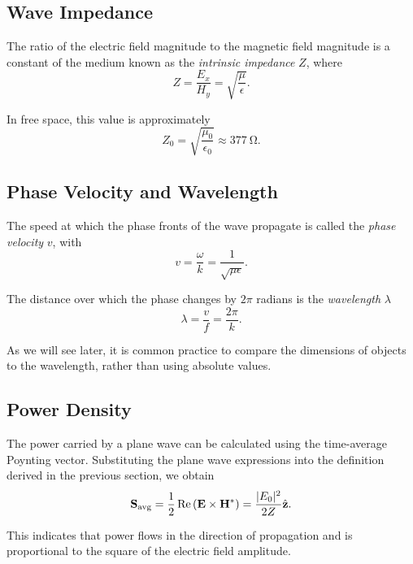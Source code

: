 \subsection{Wave Impedance}

The ratio of the electric field magnitude to the magnetic field magnitude is a constant of the medium known as the \emph{intrinsic impedance} $Z$, where
\begin{equation}
  Z = \frac{E_x}{H_y} = \sqrt{\frac{\mu}{\epsilon}}.
\end{equation}

In \gls{free space}, this value is approximately
\begin{equation}
  Z_0 = \sqrt{\frac{\mu_0}{\epsilon_0}} \approx \qty{377}{\ohm}.
\end{equation}

\subsection{Phase Velocity and Wavelength}

The speed at which the phase fronts of the wave propagate is called the \emph{phase velocity} $v$, with
\begin{equation}
  v = \frac{\omega}{k} = \frac{1}{\sqrt{\mu\epsilon}}.
\end{equation}

The distance over which the phase changes by $2\pi$ radians is the \emph{wavelength} $\lambda$
\begin{equation}
  \lambda = \frac{v}{f} = \frac{2\pi}{k}.
\end{equation}

As we will see later, it is common practice to compare the dimensions of objects to the \gls{wavelength}, rather than using absolute values.

\subsection{Power Density}

The power carried by a plane wave can be calculated using the time-average Poynting vector. Substituting the plane wave expressions into the definition derived in the previous section, we obtain
\begin{equation}
  \mathbf{S}_{\text{avg}} = \frac{1}{2} \operatorname{Re}\left( \mathbf{E} \times \mathbf{H}^* \right) = \frac{|E_0|^2}{2Z} \hat{\mathbf{z}}.
\end{equation}

This indicates that power flows in the direction of propagation and is proportional to the square of the electric field amplitude.

